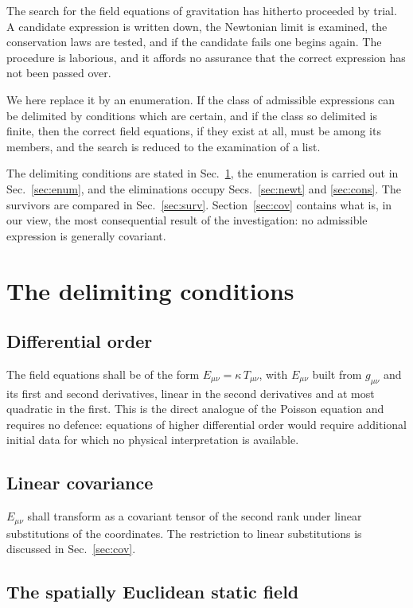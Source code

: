 \documentclass[aps,prd,reprint,amsmath,amssymb,nofootinbib,longbibliography]{revtex4-2}
\begin{document}
The search for the field equations of gravitation has hitherto proceeded by trial. A candidate
expression is written down, the Newtonian limit is examined, the conservation laws are tested, and
if the candidate fails one begins again. The procedure is laborious, and it affords no assurance
that the correct expression has not been passed over.

We here replace it by an enumeration. If the class of admissible expressions can be delimited by
conditions which are certain, and if the class so delimited is finite, then the correct field
equations, if they exist at all, must be among its members, and the search is reduced to the
examination of a list.

The delimiting conditions are stated in Sec.~\ref{sec:cond}, the enumeration is carried out in
Sec.~\ref{sec:enum}, and the eliminations occupy Secs.~\ref{sec:newt} and \ref{sec:cons}. The
survivors are compared in Sec.~\ref{sec:surv}. Section~\ref{sec:cov} contains what is, in our view,
the most consequential result of the investigation: no admissible expression is generally covariant.

\section{The delimiting conditions}
\label{sec:cond}

\subsection{Differential order}

The field equations shall be of the form $E_{\mu\nu} = \kappa\, T_{\mu\nu}$, with $E_{\mu\nu}$ built
from $g_{\mu\nu}$ and its first and second derivatives, linear in the second derivatives and at most
quadratic in the first. This is the direct analogue of the Poisson equation and requires no defence:
equations of higher differential order would require additional initial data for which no physical
interpretation is available.

\subsection{Linear covariance}

$E_{\mu\nu}$ shall transform as a covariant tensor of the second rank under linear substitutions of
the coordinates. The restriction to linear substitutions is discussed in Sec.~\ref{sec:cov}.

\subsection{The spatially Euclidean static field}
\label{sec:flat}
\end{document}
